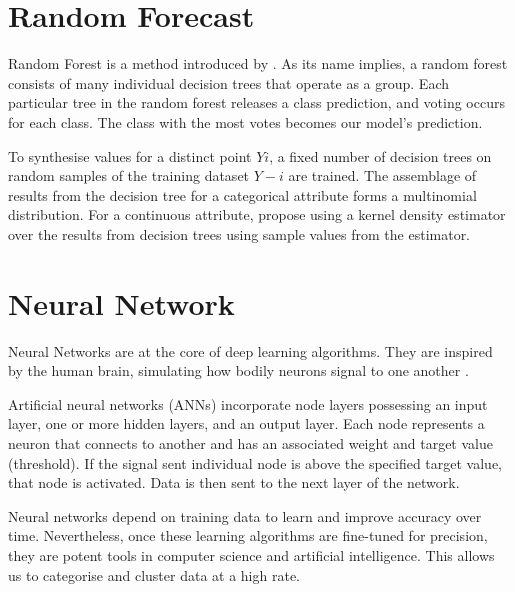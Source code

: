 \section{Random Forecast}
Random Forest is a method introduced by \cite{breiman2001random}. As its name implies, a random forest consists of many individual decision trees that operate as a group. Each particular tree in the random forest releases a class prediction, and voting occurs for each class. The class with the most votes becomes our model’s prediction.

To synthesise values for a distinct point \(Yi\), a fixed number of decision trees on random samples of the training dataset \(Y-i\) are trained. The assemblage of results from the decision tree for a categorical attribute forms a multinomial distribution. For a continuous attribute, \cite{caiola2010random} propose using a kernel density estimator over the results from decision trees using sample values from the estimator.

\section{Neural Network}
Neural Networks are at the core of deep learning algorithms. They are inspired by the human brain, simulating how bodily neurons signal to one another \citep{abdi1999neural}.

Artificial neural networks (ANNs) incorporate node layers possessing an input layer, one or more hidden layers, and an output layer. Each node represents a neuron that connects to another and has an associated weight and target value (threshold). If the signal sent individual node is above the specified target value, that node is activated. Data is then sent to the next layer of the network.

Neural networks depend on training data to learn and improve accuracy over time. Nevertheless, once these learning algorithms are fine-tuned for precision, they are potent tools in computer science and artificial intelligence. This allows us to categorise and cluster data at a high rate.



